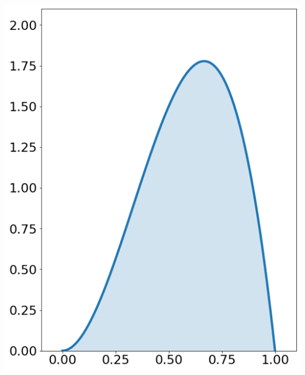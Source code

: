 \documentclass[aspectratio=169,unicode,dvipdfmx,14pt]{beamer}
\begin{document}
\begin{frame}
\begin{textblock*}{0.4\linewidth}
    \includegraphics[width=\linewidth]{beta_3_2.png}
\end{textblock*}
\end{frame}
\end{document}
